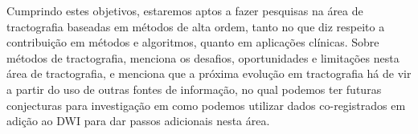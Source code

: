 \documentclass[
    12pt,                %
    oneside,            %
    a4paper,            %
    english,            %
    french,                %
    spanish,            %
    brazil                %
    ]{abntex2}
\begin{document}
Cumprindo estes objetivos, estaremos aptos a fazer pesquisas na área de tractografia baseadas em métodos de alta ordem, tanto no que diz respeito a contribuição em métodos e algoritmos, quanto em aplicações clínicas. Sobre métodos de tractografia,  menciona os desafios, oportunidades e limitações nesta área de tractografia, e menciona que a próxima evolução em tractografia há de vir a partir do uso de outras fontes de informação, no qual podemos ter futuras conjecturas para investigação em como podemos utilizar dados co-registrados em adição ao DWI para dar passos adicionais nesta área.







\end{document}
